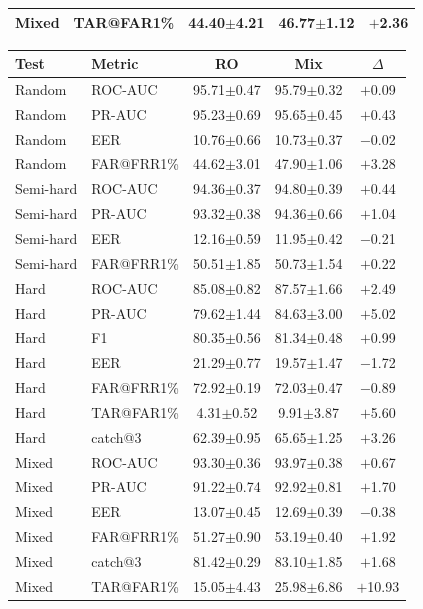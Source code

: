 \documentclass[11pt]{article}
\begin{document}
\begin{table}[!t]
\begin{minipage}[t]{0.48\textwidth}
\begin{tabular}{l l c c c}
Mixed     & TAR@FAR1\% & 44.40$\pm$4.21 & 46.77$\pm$1.12 & $+$2.36 \\
\bottomrule
\end{tabular}
\label{tab:app_wc_minilm}
\end{minipage}%
\hfill
\begin{minipage}[t]{0.48\textwidth}
\centering
\begin{tabular}{l l c c c}
\toprule
\textbf{Test} & \textbf{Metric} & \textbf{RO} & \textbf{Mix} & \textbf{$\Delta$} \\
\midrule
Random    & ROC-AUC    & 95.71$\pm$0.47 & 95.79$\pm$0.32 & $+$0.09 \\
Random    & PR-AUC     & 95.23$\pm$0.69 & 95.65$\pm$0.45 & $+$0.43 \\
Random    & EER        & 10.76$\pm$0.66 & 10.73$\pm$0.37 & $-$0.02 \\
Random    & FAR@FRR1\% & 44.62$\pm$3.01 & 47.90$\pm$1.06 & $+$3.28 \\
\midrule
Semi-hard & ROC-AUC    & 94.36$\pm$0.37 & 94.80$\pm$0.39 & $+$0.44 \\
Semi-hard & PR-AUC     & 93.32$\pm$0.38 & 94.36$\pm$0.66 & $+$1.04 \\
Semi-hard & EER        & 12.16$\pm$0.59 & 11.95$\pm$0.42 & $-$0.21 \\
Semi-hard & FAR@FRR1\% & 50.51$\pm$1.85 & 50.73$\pm$1.54 & $+$0.22 \\
\midrule
Hard      & ROC-AUC    & 85.08$\pm$0.82 & 87.57$\pm$1.66 & $+$2.49 \\
Hard      & PR-AUC     & 79.62$\pm$1.44 & 84.63$\pm$3.00 & $+$5.02 \\
Hard      & F1         & 80.35$\pm$0.56 & 81.34$\pm$0.48 & $+$0.99 \\
Hard      & EER        & 21.29$\pm$0.77 & 19.57$\pm$1.47 & $-$1.72 \\
Hard      & FAR@FRR1\% & 72.92$\pm$0.19 & 72.03$\pm$0.47 & $-$0.89 \\
Hard      & TAR@FAR1\% & \phantom{0}4.31$\pm$0.52 & \phantom{0}9.91$\pm$3.87 & $+$5.60 \\
Hard      & catch@3    & 62.39$\pm$0.95 & 65.65$\pm$1.25 & $+$3.26 \\
\midrule
Mixed     & ROC-AUC    & 93.30$\pm$0.36 & 93.97$\pm$0.38 & $+$0.67 \\
Mixed     & PR-AUC     & 91.22$\pm$0.74 & 92.92$\pm$0.81 & $+$1.70 \\
Mixed     & EER        & 13.07$\pm$0.45 & 12.69$\pm$0.39 & $-$0.38 \\
Mixed     & FAR@FRR1\% & 51.27$\pm$0.90 & 53.19$\pm$0.40 & $+$1.92 \\
Mixed     & catch@3    & 81.42$\pm$0.29 & 83.10$\pm$1.85 & $+$1.68 \\
Mixed     & TAR@FAR1\% & 15.05$\pm$4.43 & 25.98$\pm$6.86 & $+$10.93 \\
\bottomrule
\end{tabular}
\label{tab:app_wc_electra}
\end{minipage}
\end{table}
\end{document}
